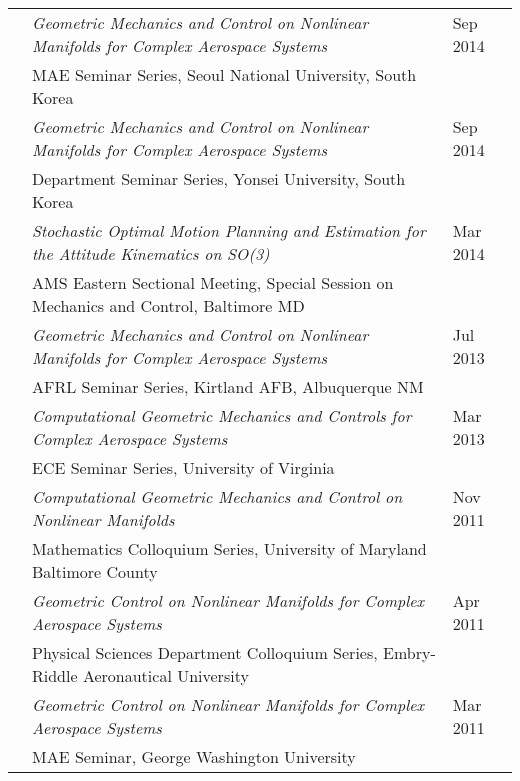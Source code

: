 \documentclass[10pt]{article}
\begin{document}
\begin{tabularx}{\textwidth}{>{\setlength{\hsize}{0.5cm}}X%
>{\setlength{\hsize}{14.3cm}}X%
>{\hfill}X}
& \textit{Geometric Mechanics and Control on Nonlinear Manifolds for Complex Aerospace Systems} & Sep 2014\\
& {MAE Seminar Series, Seoul National University}, South Korea\vspace*{0.08cm}\\


& \textit{Geometric Mechanics and Control on Nonlinear Manifolds for Complex Aerospace Systems} & Sep 2014\\
& {Department Seminar Series, Yonsei University}, South Korea\vspace*{0.08cm}\\


& \textit{Stochastic Optimal Motion Planning and Estimation for the Attitude Kinematics on SO(3)} & Mar 2014\\
& {AMS Eastern Sectional Meeting, Special Session on Mechanics and Control}, Baltimore MD\vspace*{0.08cm}\\


& \textit{Geometric Mechanics and Control on Nonlinear Manifolds for Complex Aerospace Systems
} & Jul 2013\\
& {AFRL Seminar Series}, Kirtland AFB, Albuquerque NM\vspace*{0.08cm}\\


& \textit{Computational Geometric Mechanics and Controls for Complex Aerospace Systems
} & Mar 2013\\
& {ECE Seminar Series}, University of Virginia\vspace*{0.08cm}\\

& \textit{Computational Geometric Mechanics and Control on Nonlinear Manifolds
} & Nov 2011\\
& {Mathematics Colloquium Series}, University of Maryland Baltimore County\vspace*{0.08cm}\\

& \textit{Geometric Control on Nonlinear Manifolds
for Complex Aerospace Systems
} & Apr 2011\\
& {Physical Sciences Department Colloquium Series}, Embry-Riddle Aeronautical University\vspace*{0.08cm}\\

& \textit{Geometric Control on Nonlinear Manifolds
for Complex Aerospace Systems
} & Mar 2011\\
& {MAE Seminar}, George Washington University\vspace*{0.08cm}\\


\end{tabularx}
\end{document}
